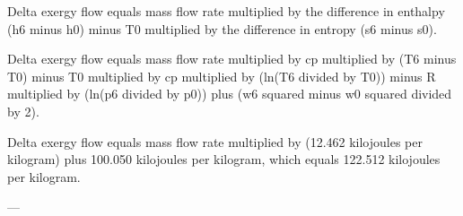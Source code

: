Delta exergy flow equals mass flow rate multiplied by the difference in enthalpy (h6 minus h0) minus T0 multiplied by the difference in entropy (s6 minus s0).  

Delta exergy flow equals mass flow rate multiplied by cp multiplied by (T6 minus T0) minus T0 multiplied by cp multiplied by (ln(T6 divided by T0)) minus R multiplied by (ln(p6 divided by p0)) plus (w6 squared minus w0 squared divided by 2).  

Delta exergy flow equals mass flow rate multiplied by (12.462 kilojoules per kilogram) plus 100.050 kilojoules per kilogram, which equals 122.512 kilojoules per kilogram.  

---